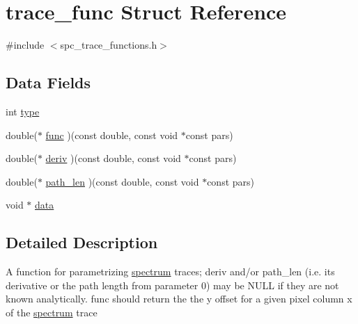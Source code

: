 \hypertarget{structtrace__func}{
\section{trace\_\-func Struct Reference}
\label{structtrace__func}
}


{\ttfamily \#include $<$spc\_\-trace\_\-functions.h$>$}\subsection*{Data Fields}
\begin{DoxyCompactItemize}
\item 
int \hyperlink{structtrace__func_aedeeb1989f1f33f55e7c641f9510864e}{type}
\item 
double($\ast$ \hyperlink{structtrace__func_a7c1a538b7ae1293d6e0fc1bdd4c2739c}{func} )(const double, const void $\ast$const pars)
\item 
double($\ast$ \hyperlink{structtrace__func_acdda34da0c92344832184081c6f41718}{deriv} )(const double, const void $\ast$const pars)
\item 
double($\ast$ \hyperlink{structtrace__func_a0d9e428a3734aaad170ce069be219f32}{path\_\-len} )(const double, const void $\ast$const pars)
\item 
void $\ast$ \hyperlink{structtrace__func_aa610d641940ef4a567aef884dd0b32da}{data}
\end{DoxyCompactItemize}


\subsection{Detailed Description}
A function for parametrizing \hyperlink{structspectrum}{spectrum} traces; deriv and/or path\_\-len (i.e. its derivative or the path length from parameter 0) may be NULL if they are not known analytically. func should return the the y offset for a given pixel column x of the \hyperlink{structspectrum}{spectrum} trace 

